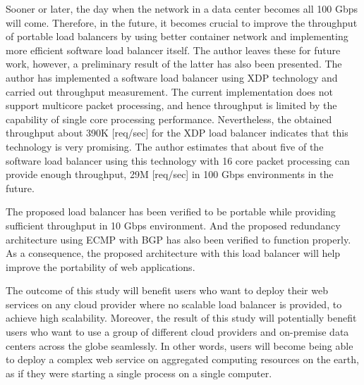 Sooner or later, the day when the network in a data center becomes all 100 Gbps will come.
Therefore, in the future, it becomes crucial to improve the throughput of portable load balancers by using better container network and implementing more efficient software load balancer itself.
The author leaves these for future work, however, a preliminary result of the latter has also been presented.
The author has implemented a software load balancer using XDP technology and carried out throughput measurement.
The current implementation does not support multicore packet processing, and hence throughput is limited by the capability of single core processing performance.
Nevertheless, the obtained throughput about 390K [req/sec] for the XDP load balancer indicates that this technology is very promising.
The author estimates that about five of the software load balancer using this technology with 16 core packet processing can provide enough throughput, 29M [req/sec] in 100 Gbps environments in the future. 

The proposed load balancer has been verified to be portable while providing sufficient throughput in 10 Gbps environment.
  And the proposed redundancy architecture using ECMP with BGP has also been verified to function properly.
  As a consequence, the proposed architecture with this load balancer will help improve the portability of web applications.


The outcome of this study will benefit users who want to deploy their web services on any cloud provider where no scalable load balancer is provided, to achieve high scalability.
Moreover, the result of this study will potentially benefit users who want to use a group of different cloud providers and on-premise data centers across the globe seamlessly.
In other words, users will become being able to deploy a complex web service on aggregated computing resources on the earth, as if they were starting a single process on a single computer.



 
